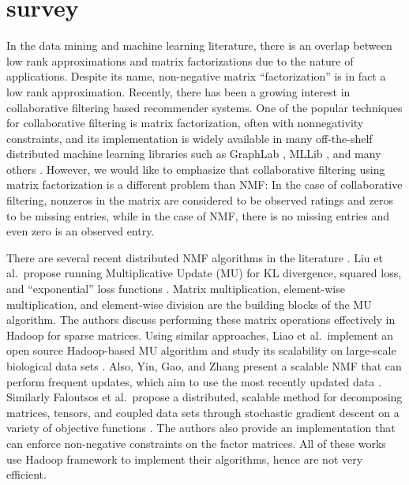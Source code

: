 \section{survey}


In the data mining and machine learning literature, there is an overlap between low rank approximations and matrix factorizations due to the nature of applications.
Despite its name, non-negative matrix ``factorization'' is in fact a low rank approximation.
Recently, there has been a growing interest in collaborative filtering based
recommender systems. One of the popular techniques
for collaborative filtering is matrix factorization, often with nonnegativity constraints,
and its implementation is widely available in many
off-the-shelf distributed machine learning libraries
such as GraphLab \cite{low2012}, MLLib \cite{meng2015mllib},
and many others \cite{satish2014,yun2014}.
However, we would like to emphasize that collaborative filtering using matrix factorization is a different problem than NMF:
In the case of collaborative filtering, nonzeros in the matrix
are considered to be observed ratings and zeros to be missing entries, while in the case of NMF, there is no missing entries and even zero is an observed entry.

There are several recent distributed NMF algorithms in the literature \cite{liao2014cloudnmf,Faloutsos2014,Yin2014,liu2010distributed}.
Liu et al.\ propose running Multiplicative Update (MU) for KL divergence, squared loss, and ``exponential'' loss functions \cite{liu2010distributed}.
Matrix multiplication, element-wise multiplication, and element-wise division are the building blocks of the MU algorithm.
The authors discuss performing these matrix operations effectively in Hadoop for sparse matrices.
Using similar approaches, Liao et al.\ implement an open source Hadoop-based MU algorithm and study its scalability on large-scale biological data sets \cite{liao2014cloudnmf}.
Also, Yin, Gao, and Zhang present a scalable NMF that can perform frequent updates, which aim to use the most recently updated data \cite{Yin2014}.
Similarly Faloutsos et al.\ propose a distributed, scalable method for decomposing matrices, tensors, and coupled data sets through stochastic gradient descent on a variety of objective functions \cite{Faloutsos2014}.
The authors also provide an implementation that can enforce non-negative constraints on the factor matrices.
All of these works use Hadoop framework to implement their algorithms, hence are not very efficient.

